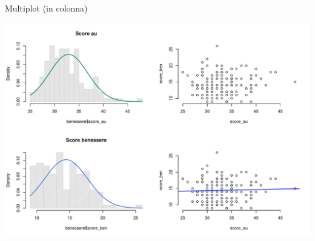 \documentclass[
  ignorenonframetext,
]{beamer}
\begin{document}
\begin{frame}{Multiplot (in colonna)}
\protect\hypertarget{multiplot-in-colonna}{}
\begin{center}\includegraphics[width=1.2\linewidth]{Practice_files/figure-beamer/unnamed-chunk-48-1} \end{center}
\end{frame}
\end{document}

